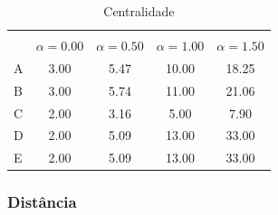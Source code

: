 \documentclass[12pt]{article}
\begin{document}
\begin{center}
  \begin{table}[ht]
    \caption{Centralidade}
    \label{tab:centrality}
    \centering
    \begin{tabular}{|lcccc|}
      \hline
      \rowcolor[HTML]{343434} 
      \multicolumn{1}{|c}{\cellcolor[HTML]{343434}{\color[HTML]{FFFFFF} }}                       & \multicolumn{4}{c|}{\cellcolor[HTML]{343434}{\color[HTML]{FFFFFF} $C_D ^{w \alpha} (i)$}}                                              \\
      \rowcolor[HTML]{656565} 
      \multicolumn{1}{|c}{\multirow{-2}{*}{\cellcolor[HTML]{343434}{\color[HTML]{FFFFFF} Nodo}}} & {\color[HTML]{FFFFFF} $\alpha = 0.00$} & {\color[HTML]{FFFFFF} $\alpha = 0.50$} & {\color[HTML]{FFFFFF} $\alpha = 1.00$} & {\color[HTML]{FFFFFF} $\alpha = 1.50$} \\
      \multicolumn{1}{|l|}{A}                                                                    & 3.00                        & 5.47                        & 10.00                       & 18.25                       \\
      \multicolumn{1}{|l|}{B}                                                                    & 3.00                        & 5.74                        & 11.00                       & 21.06                       \\
      \multicolumn{1}{|l|}{C}                                                                    & 2.00                        & 3.16                        & 5.00                        & 7.90                        \\
      \multicolumn{1}{|l|}{D}                                                                    & 2.00                        & 5.09                        & 13.00                       & 33.00                       \\
      \multicolumn{1}{|l|}{E}                                                                    & 2.00                        & 5.09                        & 13.00                       & 33.00                       \\ \hline
    \end{tabular}
  \end{table}  
\end{center}


\subsubsection{Distância} \label{sect:distance}
\end{document}
